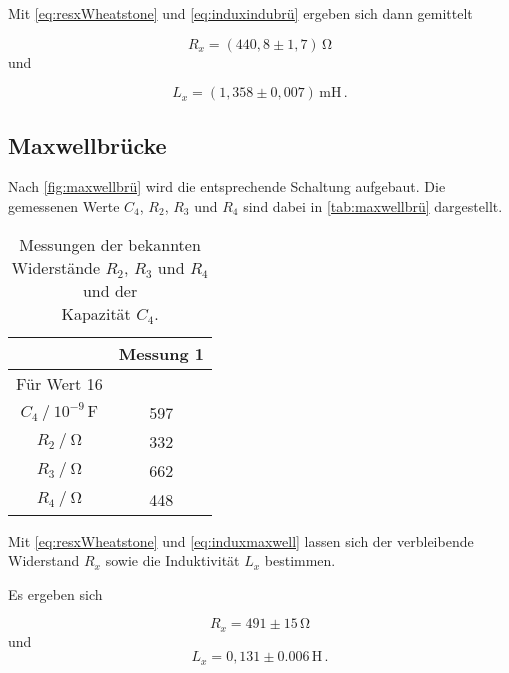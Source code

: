 Mit \eqref{eq:resxWheatstone} und \eqref{eq:induxindubrü} ergeben sich dann gemittelt

\begin{equation*}
  R_x = (440,8 \pm 1,7) \,\unit{\ohm}
\end{equation*} und

\begin{equation*}
  L_x = (1,358 \pm 0,007) \,\unit{\milli\henry} \,.
\end{equation*}


\subsection{Maxwellbrücke}

Nach \autoref{fig:maxwellbrü} wird die entsprechende Schaltung aufgebaut.  
Die gemessenen Werte $C_4$, $R_2$, $R_3$ und $R_4$ sind dabei in \autoref{tab:maxwellbrü} dargestellt.

\begin{table}[H]
  \centering
  \caption{Messungen der bekannten Widerstände $R_2$, $R_3$ und $R_4$ und der \\ Kapazität $C_4$.}
  \label{tab:maxwellbrü}
  \begin{tabular}{S S[table-format=3.1]}
    \toprule
    & {Messung 1} \\
    \midrule
    {Für Wert 16} \\
    {$C_4 \mathbin{/} 10^{-9} \,\unit{\farad}$} &  597 \\
                {$R_2 \mathbin{/} \unit{\ohm}$} &  332 \\
                {$R_3 \mathbin{/} \unit{\ohm}$} &  662 \\
                {$R_4 \mathbin{/} \unit{\ohm}$} &  448 \\
  \end{tabular}
\end{table}

Mit \eqref{eq:resxWheatstone} und \eqref{eq:induxmaxwell} lassen sich der verbleibende Widerstand $R_x$ sowie die Induktivität $L_x$ bestimmen.

Es ergeben sich

\begin{equation*}
  R_x = 491 \pm 15 \,\unit{\ohm} 
\end{equation*} 
und
\begin{equation*}
  L_x = 0,131 \pm 0.006 \,\unit{\henry} \,.
\end{equation*}

\newpage

